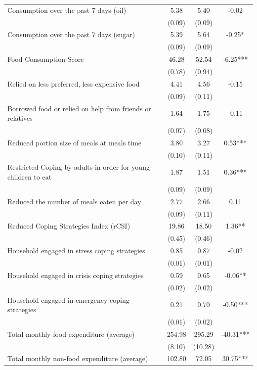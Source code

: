 \begin{tabular}{@{\extracolsep{5pt}}lccc}
Consumption over the past 7 days (oil)   & 5.38    & 5.40    & -0.02   \\
 & (0.09)  & (0.09)  &  \\ [1ex]
Consumption over the past 7 days (sugar)   & 5.39    & 5.64    & -0.25*   \\
 & (0.09)  & (0.09)  &  \\ [1ex]
Food Consumption Score   & 46.28    & 52.54    & -6.25***   \\
 & (0.78)  & (0.94)  &  \\ [1ex]
Relied on less preferred, less expensive food   & 4.41    & 4.56    & -0.15   \\
 & (0.09)  & (0.11)  &  \\ [1ex]
Borrowed food or relied on help from friends or relatives   & 1.64    & 1.75    & -0.11   \\
 & (0.07)  & (0.08)  &  \\ [1ex]
Reduced portion size of meals at meals time   & 3.80    & 3.27    & 0.53***   \\
 & (0.10)  & (0.11)  &  \\ [1ex]
Restricted Coping by adults in order for young-children to eat   & 1.87    & 1.51    & 0.36***   \\
 & (0.09)  & (0.09)  &  \\ [1ex]
Reduced the number of meals eaten per day   & 2.77    & 2.66    & 0.11   \\
 & (0.09)  & (0.11)  &  \\ [1ex]
Reduced Coping Strategies Index (rCSI)   & 19.86    & 18.50    & 1.36**   \\
 & (0.45)  & (0.46)  &  \\ [1ex]
Household engaged in stress coping strategies   & 0.85    & 0.87    & -0.02   \\
 & (0.01)  & (0.01)  &  \\ [1ex]
Household engaged in crisis coping strategies   & 0.59    & 0.65    & -0.06**   \\
 & (0.02)  & (0.02)  &  \\ [1ex]
Household engaged in emergency coping strategies   & 0.21    & 0.70    & -0.50***   \\
 & (0.01)  & (0.02)  &  \\ [1ex]
Total monthly food expenditure (average)   & 254.98    & 295.29    & -40.31***   \\
 & (8.10)  & (10.28)  &  \\ [1ex]
Total monthly non-food expenditure (average)   & 102.80    & 72.05    & 30.75***   \\

\end{tabular}
